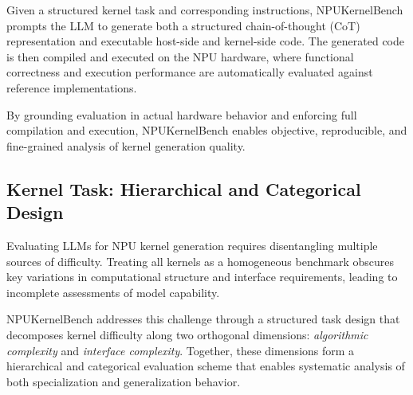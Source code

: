 Given a structured kernel task and corresponding instructions, NPUKernelBench prompts the LLM to generate both a structured chain-of-thought (CoT) representation and executable host-side and kernel-side code. The generated code is then compiled and executed on the NPU hardware, where functional correctness and execution performance are automatically evaluated against reference implementations.

By grounding evaluation in actual hardware behavior and enforcing full compilation and execution, NPUKernelBench enables objective, reproducible, and fine-grained analysis of kernel generation quality.

\subsection{Kernel Task: Hierarchical and Categorical Design}


Evaluating LLMs for NPU kernel generation requires disentangling multiple sources of difficulty. Treating all kernels as a homogeneous benchmark obscures key variations in computational structure and interface requirements, leading to incomplete assessments of model capability.

NPUKernelBench addresses this challenge through a structured task design that decomposes kernel difficulty along two orthogonal dimensions: \emph{algorithmic complexity} and \emph{interface complexity}. Together, these dimensions form a hierarchical and categorical evaluation scheme that enables systematic analysis of both specialization and generalization behavior.

